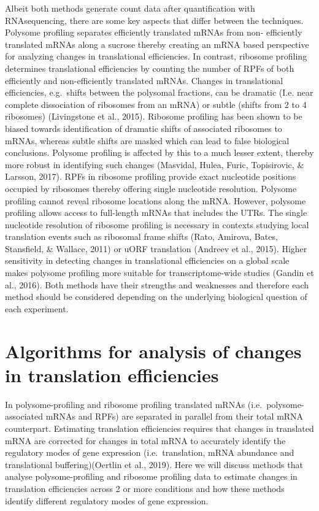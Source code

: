 \documentclass[
  12pt,
  openany]{book}
\begin{document}
Albeit both methods generate count data after quantification with RNAsequencing, there are some key aspects that differ between the techniques. Polysome profiling separates efficiently translated mRNAs from non- efficiently translated mRNAs along a sucrose thereby creating an mRNA based perspective for analyzing changes in translational efficiencies. In contrast, ribosome profiling determines translational efficiencies by counting the number of RPFs of both efficiently and non-efficiently translated mRNAs. Changes in translational efficiencies, e.g.~shifts between the polysomal fractions, can be dramatic (I.e. near complete dissociation of ribosomes from an mRNA) or subtle (shifts from 2 to 4 ribosomes) (Livingstone et al., 2015). Ribosome profiling has been shown to be biased towards identification of dramatic shifts of associated ribosomes to mRNAs, whereas subtle shifts are masked which can lead to false biological conclusions. Polysome profiling is affected by this to a much lesser extent, thereby more robust in identifying such changes (Masvidal, Hulea, Furic, Topisirovic, \& Larsson, 2017). RPFs in ribosome profiling provide exact nucleotide positions occupied by ribosomes thereby offering single nucleotide resolution. Polysome profiling cannot reveal ribosome locations along the mRNA. However, polysome profiling allows access to full-length mRNAs that includes the UTRs. The single nucleotide resolution of ribosome profiling is necessary in contexts studying local translation events such as ribosomal frame shifts (Rato, Amirova, Bates, Stansfield, \& Wallace, 2011) or uORF translation (Andreev et al., 2015). Higher sensitivity in detecting changes in translational efficiencies on a global scale makes polysome profiling more suitable for transcriptome-wide studies (Gandin et al., 2016). Both methods have their strengths and weaknesses and therefore each method should be considered depending on the underlying biological question of each experiment.

\section{Algorithms for analysis of changes in translation efficiencies}

In polysome-profiling and ribosome profiling translated mRNAs (i.e.~polysome-associated mRNAs and RPFs) are separated in parallel from their total mRNA counterpart. Estimating translation efficiencies requires that changes in translated mRNA are corrected for changes in total mRNA to accurately identify the regulatory modes of gene expression (i.e.~translation, mRNA abundance and translational buffering)(Oertlin et al., 2019). Here we will discuss methods that analyse polysome-profiling and ribosome profiling data to estimate changes in translation efficiencies across 2 or more conditions and how these methods identify different regulatory modes of gene expression.
\end{document}
